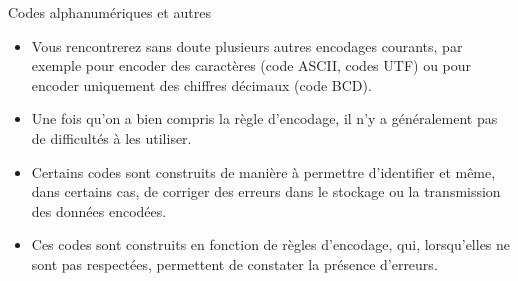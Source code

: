 \documentclass[presentation]{beamer}
\begin{document}
\begin{frame}[label={sec:org9aaea64}]{Codes alphanumériques et autres}
\begin{itemize}
\item Vous rencontrerez sans doute plusieurs autres encodages courants, par exemple pour encoder des caractères (code ASCII, codes UTF) ou pour encoder uniquement des chiffres décimaux (code BCD).

\item Une fois qu'on a bien compris la règle d'encodage, il n'y a généralement pas de difficultés à les utiliser.

\item Certains codes sont construits de manière à permettre d'identifier et même, dans certains cas, de corriger des erreurs dans le stockage ou la transmission des données encodées.

\item Ces codes sont construits en fonction de règles d'encodage, qui, lorsqu'elles ne sont pas respectées, permettent de constater la présence d'erreurs.
\end{itemize}
\end{frame}
\end{document}
